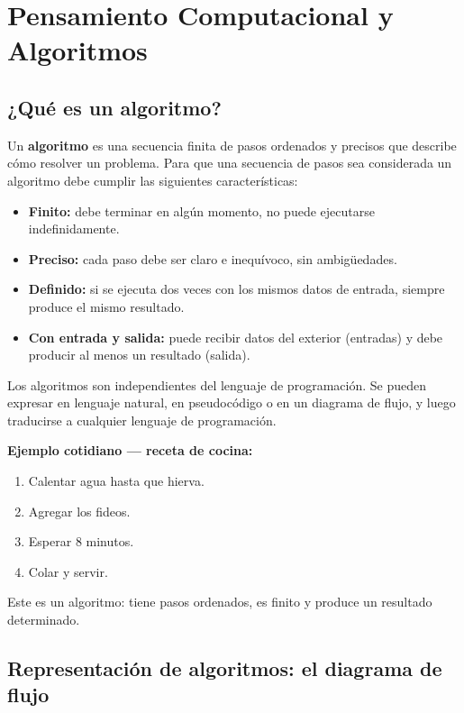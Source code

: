 \chapter{Pensamiento Computacional y Algoritmos}

\section{¿Qué es un algoritmo?}

Un \textbf{algoritmo} es una secuencia finita de pasos ordenados y precisos que describe cómo resolver un problema. Para que una secuencia de pasos sea considerada un algoritmo debe cumplir las siguientes características:

\begin{itemize}
    \item \textbf{Finito:} debe terminar en algún momento, no puede ejecutarse indefinidamente.
    \item \textbf{Preciso:} cada paso debe ser claro e inequívoco, sin ambigüedades.
    \item \textbf{Definido:} si se ejecuta dos veces con los mismos datos de entrada, siempre produce el mismo resultado.
    \item \textbf{Con entrada y salida:} puede recibir datos del exterior (entradas) y debe producir al menos un resultado (salida).
\end{itemize}

\begin{notabox}
Los algoritmos son independientes del lenguaje de programación. Se pueden expresar en lenguaje natural, en pseudocódigo o en un diagrama de flujo, y luego traducirse a cualquier lenguaje de programación.
\end{notabox}

\textbf{Ejemplo cotidiano --- receta de cocina:}
\begin{enumerate}
    \item Calentar agua hasta que hierva.
    \item Agregar los fideos.
    \item Esperar 8 minutos.
    \item Colar y servir.
\end{enumerate}

Este es un algoritmo: tiene pasos ordenados, es finito y produce un resultado determinado.

\section{Representación de algoritmos: el diagrama de flujo}

